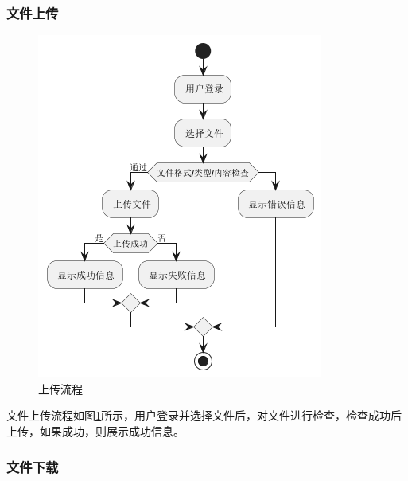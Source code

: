 \subsubsection{文件上传}

\begin{figure}[H]
    \begin{center}
        \includegraphics[scale=0.7]{examples/上传流程图.png}
        \caption{上传流程}
        \label{fig:upload}
    \end{center}
\end{figure}

文件上传流程如图\ref{fig:upload}所示，用户登录并选择文件后，对文件进行检查，检查成功后上传，如果成功，则展示成功信息。

\subsubsection{文件下载}

